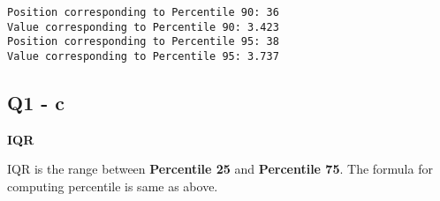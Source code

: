 \documentclass[11pt]{article}
\begin{document}
    \begin{Verbatim}[commandchars=\\\{\}]
Position corresponding to Percentile 90: 36
Value corresponding to Percentile 90: 3.423
Position corresponding to Percentile 95: 38
Value corresponding to Percentile 95: 3.737

    \end{Verbatim}

    \subsection{Q1 - c}\label{q1---c}

    \textbf{IQR}

IQR is the range between \textbf{Percentile 25} and \textbf{Percentile
75}. The formula for computing percentile is same as above.
\end{document}

